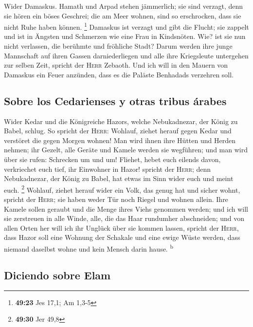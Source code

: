  Wider Damaskus. Hamath und Arpad stehen jämmerlich; sie
sind verzagt, denn sie hören ein böses Geschrei; die am Meer wohnen,
sind so erschrocken, dass sie nicht Ruhe haben können. \footnote{\textbf{49:23}
  Jes 17,1; Am 1,3-5}  Damaskus ist verzagt und gibt die
Flucht; sie zappelt und ist in Ängsten und Schmerzen wie eine Frau in
Kindsnöten.  Wie? ist sie nun nicht verlassen, die
berühmte und fröhliche Stadt?  Darum werden ihre junge
Mannschaft auf ihren Gassen darniederliegen und alle ihre Kriegsleute
untergehen zur selben Zeit, spricht der \textsc{Herr} Zebaoth.
 Und ich will in den Mauern von Damaskus ein Feuer
anzünden, dass es die Paläste Benhadads verzehren soll.

\hypertarget{sobre-los-cedarienses-y-otras-tribus-uxe1rabes}{%
\subsection{Sobre los Cedarienses y otras tribus
árabes}\label{sobre-los-cedarienses-y-otras-tribus-uxe1rabes}}

 Wider Kedar und die Königreiche Hazors, welche
Nebukadnezar, der König zu Babel, schlug. So spricht der \textsc{Herr}:
Wohlauf, ziehet herauf gegen Kedar und verstöret die gegen Morgen
wohnen!  Man wird ihnen ihre Hütten und Herden nehmen;
ihr Gezelt, alle Geräte und Kamele werden sie wegführen; und man wird
über sie rufen: Schrecken um und um!  Fliehet, hebet euch
eilends davon, verkriechet euch tief, ihr Einwohner in Hazor! spricht
der \textsc{Herr}; denn Nebukadnezar, der König zu Babel, hat etwas im
Sinn wider euch und meint euch. \footnote{\textbf{49:30} Jer 49,8}
 Wohlauf, ziehet herauf wider ein Volk, das genug hat und
sicher wohnt, spricht der \textsc{Herr}; sie haben weder Tür noch Riegel
und wohnen allein.  Ihre Kamele sollen geraubt und die
Menge ihres Viehs genommen werden; und ich will sie zerstreuen in alle
Winde, alle, die das Haar rundumher abschneiden; und von allen Orten her
will ich ihr Unglück über sie kommen lassen, spricht der \textsc{Herr},
 dass Hazor soll eine Wohnung der Schakale und eine ewige
Wüste werden, dass niemand daselbst wohne und kein Mensch darin hause.
\textsuperscript{b}

\hypertarget{diciendo-sobre-elam}{%
\subsection{Diciendo sobre Elam}\label{diciendo-sobre-elam}}

